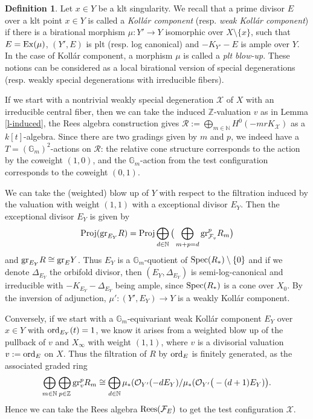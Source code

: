 \documentclass[12pt,reqno]{amsart}%
\newcommand{\Z}{{\mathbb{Z} }}
\newcommand{\bN}{{\mathbb{N} }}
\newcommand{\bG}{{\mathbb{G} }}
\newcommand{\bZ}{{\mathbb{Z} }}
\newcommand{\cR}{{\mathcal{R}}}
\newcommand{\cX}{{\mathcal{X}}}
\newcommand{\cF}{\mathcal{F}}
\newcommand{\ord}{{\rm ord}}
\newcommand{\gr}{{\rm gr}}
\theoremstyle{definition}
\newtheorem{defn}[thm]{Definition}
\theoremstyle{remark}
\newcommand{\N}{{\mathbb{N}}}
\newcommand{\Spec}{{\rm Spec}}
\begin{document}
\begin{subappendices}
\begin{defn}
Let $x\in Y$ be a klt singularity. 
We recall that a prime divisor $E$ over a klt point $x\in Y$ is called a {\it Koll\'ar component} (resp. {\it weak Koll\'ar component}) if there is a birational morphism $\mu\colon Y'\to Y$ isomorphic over $X\setminus\{x\}$, such that $E={\rm Ex}(\mu)$, $(Y',E)$ is plt (resp. log canonical) and $-K_{Y'}-E$ is ample over $Y$. In the case of Koll\'ar component, a morphism $\mu$ is called a {\it plt blow-up}. These notions can be considered as a local birational version of special degenerations (resp. weakly special degenerations with irreducible fibers). 
\end{defn}


If we start with a nontrivial  weakly special degeneration $\cX$ of $X$ with an irreducible central fiber,  then we can take the induced $\bZ$-valuation $v$ as in Lemma \ref{l-induced},  the Rees algebra construction gives
$\cR:=\bigoplus_{m\in \bN} H^0(-mrK_{\cX})$ as a $k[t]$-algebra.  Since there are two gradings given by $m$ and $p$, we indeed have a $T=(\mathbb{G}_m)^2$-actions on $\cR$: the relative cone structure corresponds to the action by the coweight $(1,0)$, and the $\mathbb{G}_m$-action from the test configuration corresponds to the coweight $(0,1)$. %



We can take the (weighted) blow up of $Y$ with respect to the filtration induced by the valuation with weight $(1,1)$ with a exceptional divisor $E_Y$.
 Then the exceptional divisor $E_Y$ is given by 
$${\rm Proj}(\gr_{E_Y} R)={\rm Proj}\bigoplus_{d \in \N} \big(\bigoplus_{m+p=d} \gr_{\cF_{v}}^p R_m\big)$$
and $\gr_{E_Y} R\cong \gr_EY$. Thus $E_Y$ is a $\bG_m$-quotient of $\Spec(R_*)\setminus\{0\}$
and if we denote $\Delta_{E_Y}$ the orbifold divisor, then $(E_Y, \Delta_{E_Y})$ is semi-log-canonical and irreducible with $-K_{E_{Y}}-\Delta_{E_Y}$ being ample, since  ${\rm Spec}(R_*)$  is a cone over $X_0$. By the inversion of adjunction, $\mu'\colon(Y',E_Y)\to Y$ is a weakly Koll\'ar component. 

Conversely, if we start with a $\mathbb{G}_m$-equivariant weak Koll\'ar component $E_Y$ over $x\in Y$ with $\ord_{E_Y}(t)=1$, 
we know it arises from a weighted blow up of the pullback of $v$ and $X_{\infty}$ with weight $(1,1)$, where $v$ is  a divisorial valuation $v:=\ord_E$ on $X$. 
Thus the filtration of $R$ by $\ord_E$ is finitely generated, as the associated graded ring  
$$\bigoplus_{m \in \N} \bigoplus_{p \in \Z} \gr_{v}^p R_m \cong \bigoplus_{d\in \N} \mu_*(\mathcal{O}_{Y'}(-dE_Y)/ \mu_*(\mathcal{O}_{Y'}\big(-(d+1)E_{Y})\big). $$
Hence we can take the Rees algebra ${\rm Rees}(\cF_E)$ to get the test configuration $\cX$. 



\end{subappendices}
\end{document}
